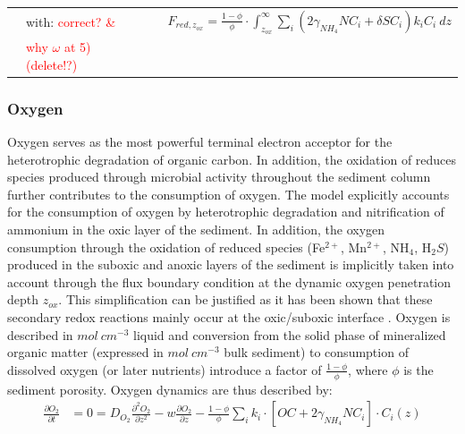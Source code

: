 \documentclass[gmd, manuscript]{copernicus}
\begin{document}
\begin{table}[tbp]
\begin{tabular}{ |l| l| l|}
&with:\textcolor{red}{ correct? \&}&$ \quad F_{red,z_{ox}}=\frac{1-\phi}{\phi} \cdot \int_{z_{ox}}^{\infty}  \sum_i \left( 2\gamma_{NH_4} NC_i + \delta SC_i \right) k_i C_i\ dz$ \\
&\textcolor{red}{why $\omega$ at 5) (delete!?)}&\\
\hline    
\end{tabular}
\label{Tab:BC_OM+O2}
\end{table}


\subsubsection{Oxygen}
Oxygen serves as the most powerful terminal electron acceptor for the heterotrophic degradation of organic carbon. In addition, the oxidation of reduces species produced through microbial activity throughout the 
sediment column further contributes to the consumption of oxygen. The model explicitly accounts for the consumption of oxygen by heterotrophic degradation and nitrification of ammonium in the oxic layer of the sediment. 
In addition, the oxygen consumption through the oxidation of reduced species (Fe$^{2+}$, Mn$^{2+}$, NH$_4$, H$_2S$) produced in the suboxic and anoxic layers of the sediment is implicitly taken into account through the flux 
boundary condition at the dynamic oxygen penetration depth $z_{ox}$. This simplification can be justified as it has been shown that these secondary redox reactions mainly occur at the oxic/suboxic interface \citep{soetaert_model_1996}.  
Oxygen is described in $mol\ cm^{-3}$ liquid and conversion from the solid phase of mineralized organic matter (expressed in $mol\ cm^{-3}$ bulk sediment) to consumption of dissolved oxygen (or later nutrients) introduce 
a factor of $\frac{1-\phi}{\phi}$, where $\phi$ is the sediment porosity. Oxygen dynamics are thus described by:
\begin{align} 
 \frac{\partial O_2}{\partial t} &= 0= D_{O_2}\frac{\partial^2 O_2 }{\partial z^2} - w\frac{\partial O_2}{\partial z} - \frac{1-\phi}{\phi}\sum_i k_i \cdot [ OC + 2 \gamma_{NH_4} NC_i ]\cdot C_{i}(z) \label{eq:ODE_O2_1}
\end{align}
\end{document}
